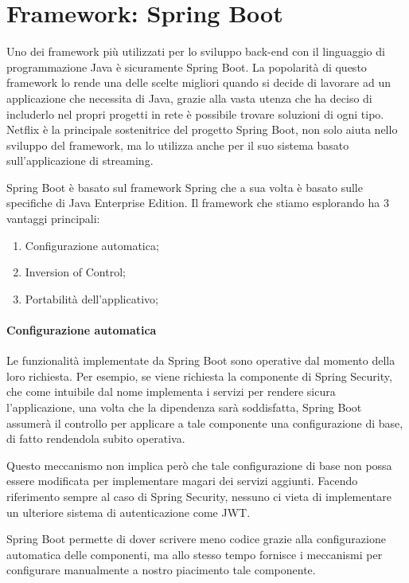 \section{Framework: Spring Boot}
Uno dei framework più utilizzati per lo sviluppo back-end con il linguaggio di programmazione Java è sicuramente Spring Boot. La popolarità di questo framework lo rende una delle scelte migliori quando si decide di lavorare ad un applicazione che necessita di Java, grazie alla vasta utenza che ha deciso di includerlo nel propri progetti in rete è possibile trovare soluzioni di ogni tipo. Netflix è la principale sostenitrice del progetto Spring Boot, non solo aiuta nello sviluppo del framework, ma lo utilizza anche per il suo sistema basato sull'applicazione di streaming.

Spring Boot è basato sul framework Spring che a sua volta è basato sulle specifiche di Java Enterprise Edition. Il framework che stiamo esplorando ha 3 vantaggi principali:
\begin{enumerate}
    \item Configurazione automatica;
    \item Inversion of Control;
    \item Portabilità dell'applicativo;
\end{enumerate}

\paragraph{Configurazione automatica}
Le funzionalità implementate da Spring Boot sono operative dal momento della loro richiesta. Per esempio, se viene richiesta la componente di Spring Security, che come intuibile dal nome implementa i servizi per rendere sicura l'applicazione, una volta che la dipendenza sarà soddisfatta, Spring Boot assumerà il controllo per applicare a tale componente una configurazione di base, di fatto rendendola subito operativa.

Questo meccanismo non implica però che tale configurazione di base non possa essere modificata per implementare magari dei servizi aggiunti. Facendo riferimento sempre al caso di Spring Security, nessuno ci vieta di implementare un ulteriore sistema di autenticazione come \ac{JWT}.

Spring Boot permette di dover scrivere meno codice grazie alla configurazione automatica delle componenti, ma allo stesso tempo fornisce i meccanismi per configurare manualmente a nostro piacimento tale componente.

